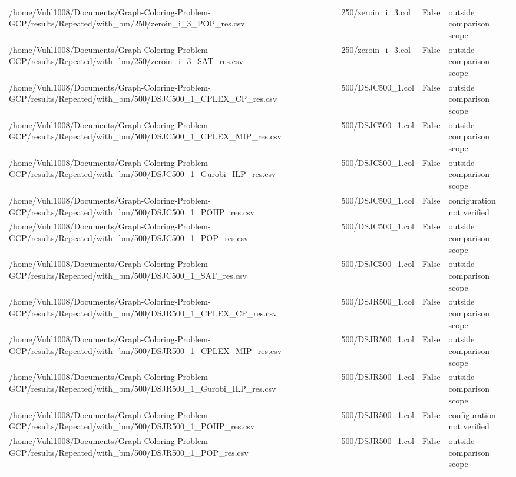 \begin{table}[htbp]
\begin{tabular}{llll}
/home/Vuhl1008/Documents/Graph-Coloring-Problem-GCP/results/Repeated/with\_bm/250/zeroin\_i\_3\_POP\_res.csv & 250/zeroin\_i\_3.col & False & outside comparison scope \\
/home/Vuhl1008/Documents/Graph-Coloring-Problem-GCP/results/Repeated/with\_bm/250/zeroin\_i\_3\_SAT\_res.csv & 250/zeroin\_i\_3.col & False & outside comparison scope \\
/home/Vuhl1008/Documents/Graph-Coloring-Problem-GCP/results/Repeated/with\_bm/500/DSJC500\_1\_CPLEX\_CP\_res.csv & 500/DSJC500\_1.col & False & outside comparison scope \\
/home/Vuhl1008/Documents/Graph-Coloring-Problem-GCP/results/Repeated/with\_bm/500/DSJC500\_1\_CPLEX\_MIP\_res.csv & 500/DSJC500\_1.col & False & outside comparison scope \\
/home/Vuhl1008/Documents/Graph-Coloring-Problem-GCP/results/Repeated/with\_bm/500/DSJC500\_1\_Gurobi\_ILP\_res.csv & 500/DSJC500\_1.col & False & outside comparison scope \\
/home/Vuhl1008/Documents/Graph-Coloring-Problem-GCP/results/Repeated/with\_bm/500/DSJC500\_1\_POHP\_res.csv & 500/DSJC500\_1.col & False & configuration not verified \\
/home/Vuhl1008/Documents/Graph-Coloring-Problem-GCP/results/Repeated/with\_bm/500/DSJC500\_1\_POP\_res.csv & 500/DSJC500\_1.col & False & outside comparison scope \\
/home/Vuhl1008/Documents/Graph-Coloring-Problem-GCP/results/Repeated/with\_bm/500/DSJC500\_1\_SAT\_res.csv & 500/DSJC500\_1.col & False & outside comparison scope \\
/home/Vuhl1008/Documents/Graph-Coloring-Problem-GCP/results/Repeated/with\_bm/500/DSJR500\_1\_CPLEX\_CP\_res.csv & 500/DSJR500\_1.col & False & outside comparison scope \\
/home/Vuhl1008/Documents/Graph-Coloring-Problem-GCP/results/Repeated/with\_bm/500/DSJR500\_1\_CPLEX\_MIP\_res.csv & 500/DSJR500\_1.col & False & outside comparison scope \\
/home/Vuhl1008/Documents/Graph-Coloring-Problem-GCP/results/Repeated/with\_bm/500/DSJR500\_1\_Gurobi\_ILP\_res.csv & 500/DSJR500\_1.col & False & outside comparison scope \\
/home/Vuhl1008/Documents/Graph-Coloring-Problem-GCP/results/Repeated/with\_bm/500/DSJR500\_1\_POHP\_res.csv & 500/DSJR500\_1.col & False & configuration not verified \\
/home/Vuhl1008/Documents/Graph-Coloring-Problem-GCP/results/Repeated/with\_bm/500/DSJR500\_1\_POP\_res.csv & 500/DSJR500\_1.col & False & outside comparison scope \\

\end{tabular}
\end{table}
